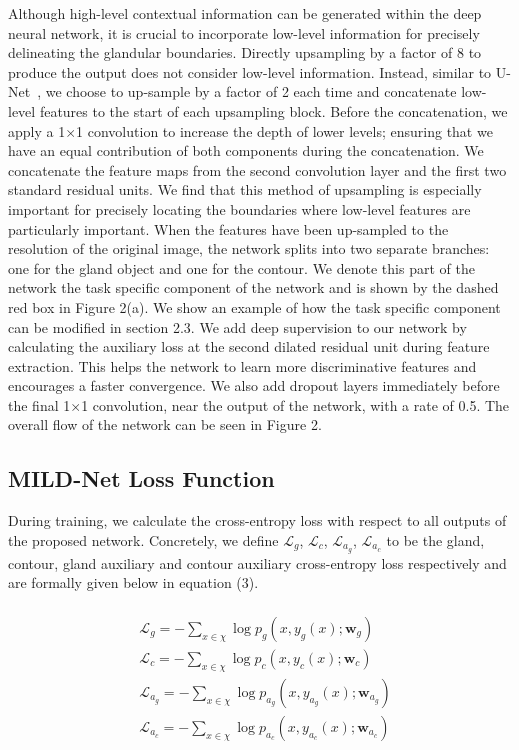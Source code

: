 \documentclass[3p]{elsarticle}
\begin{document}
Although high-level contextual information can be generated within the deep neural network, it is crucial to incorporate low-level information for precisely delineating the glandular boundaries. Directly upsampling by a factor of 8 to produce the output does not consider low-level information. Instead, similar to U-Net~\citep{ronneberger2015u}, we choose to up-sample by a factor of 2 each time and concatenate low-level features to the start of each upsampling block. Before the concatenation, we apply a 1$\times$1 convolution to increase the depth of lower levels; ensuring that we have an equal contribution of both components during the concatenation. We concatenate the feature maps from the second convolution layer and the first two standard residual units. We find that this method of upsampling is especially important for precisely locating the boundaries where low-level features are particularly important. When the features have been up-sampled to the resolution of the original image, the network splits into two separate branches: one for the gland object and one for the contour. We denote this part of the network the task specific component of the network and is shown by the dashed red box in Figure 2(a). We show an example of how the task specific component can be modified in section 2.3. We add deep supervision to our network by calculating the auxiliary loss at the second dilated residual unit during feature extraction. This helps the network to learn more discriminative features and encourages a faster convergence. We also add dropout layers immediately before the final 1$\times$1 convolution, near the output of the network, with a rate of 0.5. The overall flow of the network can be seen in Figure 2. 

\subsection{MILD-Net Loss Function}

During training, we calculate the cross-entropy loss with respect to all outputs of the proposed network. Concretely, we define $\mathcal{L}_g$, $\mathcal{L}_c$, $\mathcal{L}_{a_g}$, $\mathcal{L}_{a_c}$ to be the gland, contour, gland auxiliary and contour auxiliary cross-entropy loss respectively and are formally given below in equation (3).

\begin{equation}
\begin{split} \\
&\mathcal{L}_g = -\sum_{x \in \chi}{\log p_g(x, y_g(x);  \mathbold{w}_g)}\\ 
&\mathcal{L}_c = -\sum_{x \in \chi}{\log p_c(x, y_c(x);\mathbold{w}_c)}\\
&\mathcal{L}_{a_g} = -\sum_{x \in \chi}{\log p_{a_g}(x, y_{a_g}(x);\mathbold{w}_{a_g})}\\
&\mathcal{L}_{a_c} = -\sum_{x \in \chi}{\log p_{a_c}(x, y_{a_c}(x);\mathbold{w}_{a_c})}
\end{split}
\end{equation}
\end{document}
